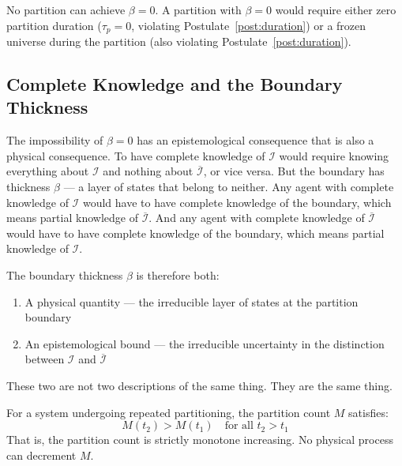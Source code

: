 \begin{corollary}
\label{cor:noperfect}
No partition can achieve $\beta = 0$. A partition with $\beta = 0$ would require
either zero partition duration ($\tau_p = 0$, violating
Postulate~\ref{post:duration}) or a frozen universe during the partition (also
violating Postulate~\ref{post:duration}).
\end{corollary}

\subsection{Complete Knowledge and the Boundary Thickness}
\label{subsec:knowledge}

The impossibility of $\beta = 0$ has an epistemological consequence that is
also a physical consequence. To have complete knowledge of $\mathcal{I}$ would
require knowing everything about $\mathcal{I}$ and nothing about
$\overline{\mathcal{I}}$, or vice versa. But the boundary has thickness $\beta$
--- a layer of states that belong to neither. Any agent with complete knowledge
of $\mathcal{I}$ would have to have complete knowledge of the boundary, which
means partial knowledge of $\overline{\mathcal{I}}$. And any agent with complete
knowledge of $\overline{\mathcal{I}}$ would have to have complete knowledge of
the boundary, which means partial knowledge of $\mathcal{I}$.

The boundary thickness $\beta$ is therefore both:
\begin{enumerate}
    \item A physical quantity --- the irreducible layer of states at the
          partition boundary
    \item An epistemological bound --- the irreducible uncertainty in the
          distinction between $\mathcal{I}$ and $\overline{\mathcal{I}}$
\end{enumerate}

These two are not two descriptions of the same thing. They are the same thing.

\begin{theorem}
\label{thm:floor}
For a system undergoing repeated partitioning, the partition count $M$ satisfies:
\begin{equation}
    M(t_2) > M(t_1) \quad \text{for all } t_2 > t_1
    \label{eq:monotone}
\end{equation}
That is, the partition count is strictly monotone increasing. No physical process
can decrement $M$.
\end{theorem}

